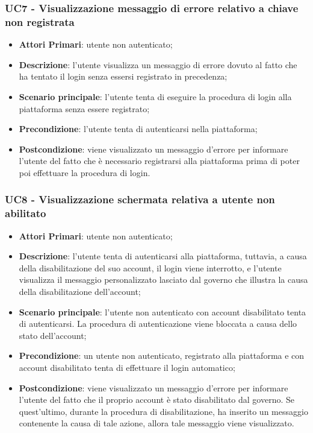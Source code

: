 \subsubsection{UC7 - Visualizzazione messaggio di errore relativo a chiave non registrata}
\begin{itemize}
	\item \textbf{Attori Primari}:
	utente non autenticato;
	\item \textbf{Descrizione}:
	l'utente visualizza un messaggio di errore dovuto al fatto che ha tentato il login senza essersi registrato in precedenza;
	\item \textbf{Scenario principale}:
	l'utente tenta di eseguire la procedura di login alla piattaforma senza essere registrato;
	\item \textbf{Precondizione}:
	l'utente tenta di autenticarsi nella piattaforma;
	\item \textbf{Postcondizione}: viene visualizzato un messaggio d'errore per informare l'utente del fatto che è necessario registrarsi alla piattaforma prima di poter poi effettuare la procedura di login.
\end{itemize}
\subsubsection{UC8 - Visualizzazione schermata relativa a utente non abilitato}
\begin{itemize}
	\item \textbf{Attori Primari}: utente non autenticato;
	\item \textbf{Descrizione}:
	l'utente tenta di autenticarsi alla piattaforma, tuttavia, a causa della disabilitazione del suo account, il login viene interrotto, e l'utente visualizza il messaggio personalizzato lasciato dal governo che illustra la causa della disabilitazione dell'account;
	\item \textbf{Scenario principale}:
	l'utente non autenticato con account disabilitato tenta di autenticarsi. La procedura di autenticazione viene bloccata a causa dello stato dell'account;
	\item \textbf{Precondizione}:
	un utente non autenticato, registrato alla piattaforma e con account disabilitato tenta di effettuare il login automatico;
	\item \textbf{Postcondizione}:  viene visualizzato un messaggio d'errore per informare l'utente del fatto che il proprio account è stato disabilitato dal governo. Se quest'ultimo, durante la procedura di disabilitazione, ha inserito un messaggio contenente la causa di tale azione, allora tale messaggio viene visualizzato.
\end{itemize}
